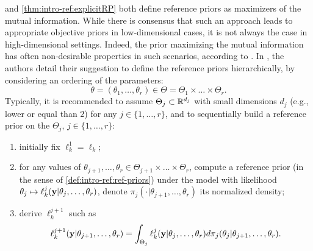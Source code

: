 and \cref{thm:intro-ref:explicitRP}
both define reference priors as maximizers of the mutual information.
While there is consensus that such an approach leads to appropriate objective priors in low-dimensional cases, it is not always the case in high-dimensional settings.
Indeed, the prior maximizing the mutual information has often non-desirable properties in such scenarios, according to \citet{berger_overall_2015}. %
In \cite{berger_development_1992}, the authors detail their suggestion to define the reference priors hierarchically, by considering an ordering of the parameters:
 \begin{equation}\label{eq:intro-ref:hierartheta}
     \theta = (\theta_1,\dots,\theta_r) \in \Theta=\Theta_1\times\dots\times\Theta_r.
 \end{equation}
Typically, it is recommended to assume $\Theta_j\subset\mathbb{R}^{d_j}$ with small dimensions $d_j$ (e.g., lower or equal than $2$) for any $j\in\{1,\dots,r\}$, and to sequentially build a reference prior on the $\Theta_j$,  $j\in\{1,\dots,r\}$:
 \begin{enumerate}
     \item initially fix $\ell_k^1=\ell_k$;
     \item for any values of $\theta_{j+1},\dots,\theta_r\in\Theta_{j+1}\times\dots\times\Theta_r$, compute a reference prior (in the sense of \cref{def:intro-ref:ref-priors})  under the model with likelihood $\theta_j\mapsto\ell_k^j(\mathbf{y}|\theta_j,\dots,\theta_r)$, denote $\pi_j(\cdot|\theta_{j+1},\dots,\theta_r)$ its normalized density;
     \item derive $\ell_k^{j+1}$ such as 
         \begin{equation}\label{eq:hier:condlikeint}
            \ell_k^{j+1}(\mathbf{y}|\theta_{j+1},\dots,\theta_r) =  \int_{\Theta_j}\ell_k^j(\mathbf{y}|\theta_j,\dots,\theta_r)d\pi_j(\theta_j|\theta_{j+1},\dots,\theta_r).
         \end{equation}
 \end{enumerate}


